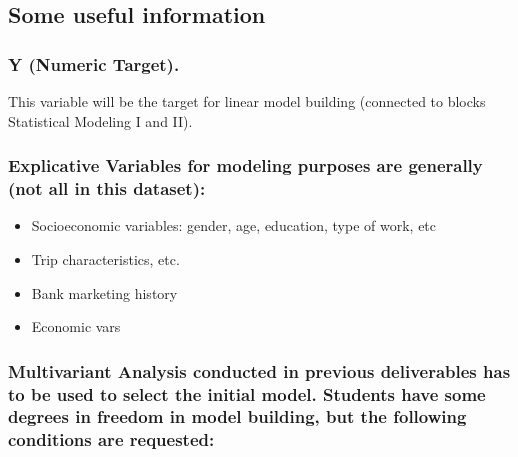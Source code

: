 \documentclass[
  18pt,
  a4paper]{article}
\providecommand{\tightlist}{%
  \setlength{\itemsep}{0pt}\setlength{\parskip}{0pt}}
\begin{document}
\hypertarget{some-useful-information}{%
\subsection{Some useful information}\label{some-useful-information}}

\hypertarget{y-numeric-target.}{%
\subsubsection{Y (Numeric Target).}\label{y-numeric-target.}}

This variable will be the target for linear model building (connected to
blocks Statistical Modeling I and II).

\hypertarget{explicative-variables-for-modeling-purposes-are-generally-not-all-in-this-dataset}{%
\subsubsection{Explicative Variables for modeling purposes are generally
(not all in this
dataset):}\label{explicative-variables-for-modeling-purposes-are-generally-not-all-in-this-dataset}}

\begin{itemize}
\tightlist
\item
  Socioeconomic variables: gender, age, education, type of work, etc
\item
  Trip characteristics, etc.
\item
  Bank marketing history
\item
  Economic vars
\end{itemize}

\hypertarget{multivariant-analysis-conducted-in-previous-deliverables-has-to-be-used-to-select-the-initial-model.-students-have-some-degrees-in-freedom-in-model-building-but-the-following-conditions-are-requested}{%
\subsubsection{Multivariant Analysis conducted in previous deliverables
has to be used to select the initial model. Students have some degrees
in freedom in model building, but the following conditions are
requested:}\label{multivariant-analysis-conducted-in-previous-deliverables-has-to-be-used-to-select-the-initial-model.-students-have-some-degrees-in-freedom-in-model-building-but-the-following-conditions-are-requested}}
\end{document}
